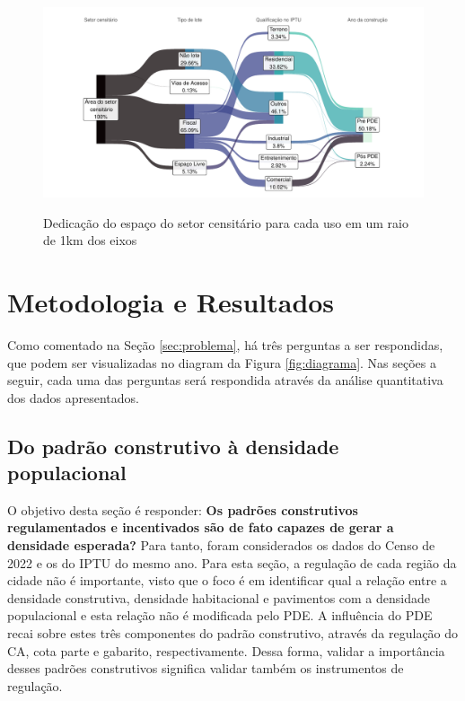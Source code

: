 \begin{figure}[h]
    \centering
    \caption{Dedicação do espaço do setor censitário para cada uso em um raio de 1km dos eixos}
    \includegraphics[width = \linewidth]{figuras/area_setor.pdf}
    \label{fig:area-setor}
\end{figure}

\chapter{Metodologia e Resultados}
\label{chp:analise}

Como comentado na Seção \ref{sec:problema}, há três perguntas a ser respondidas, que podem ser visualizadas no diagram da Figura \ref{fig:diagrama}. Nas seções a seguir, cada uma das perguntas será respondida através da análise quantitativa dos dados apresentados.


\section{Do padrão construtivo à densidade populacional}
\label{sec:perg1}


O objetivo desta seção é responder: \textbf{Os padrões construtivos regulamentados e incentivados são de fato capazes de gerar a densidade esperada?} Para tanto, foram considerados os dados do Censo de 2022 e os do IPTU do mesmo ano. Para esta seção, a regulação de cada região da cidade não é importante, visto que o foco é em identificar qual a relação entre a densidade construtiva, densidade habitacional e pavimentos com a densidade populacional e esta relação não é modificada pelo PDE. A influência do PDE recai sobre estes três componentes do padrão construtivo, através da regulação do CA, cota parte e gabarito, respectivamente. Dessa forma, validar a importância desses padrões construtivos significa validar também os instrumentos de regulação.

